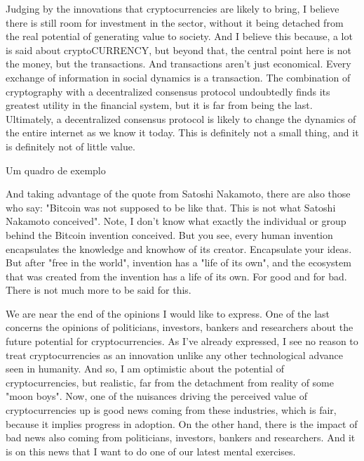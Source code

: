 Judging by the innovations that cryptocurrencies are likely to bring, I believe there is still room for investment in the sector, without it being detached from the real potential of generating value to society. And I believe this because, a lot is said about cryptoCURRENCY, but beyond that, the central point here is not the money, but the transactions. And transactions aren't just economical. Every exchange of information in social dynamics is a transaction. The combination of cryptography with a decentralized consensus protocol undoubtedly finds its greatest utility in the financial system, but it is far from being the last. Ultimately, a decentralized consensus protocol is likely to change the dynamics of the entire internet as we know it today. This is definitely not a small thing, and it is definitely not of little value.

\begin{quadro}[!hbt]
  \centering
  \caption{Um quadro de exemplo}
  \label{quadro-exemplo}
\end{quadro}

And taking advantage of the quote from Satoshi Nakamoto, there are also those who say: "Bitcoin was not supposed to be like that. This is not what Satoshi Nakamoto conceived". Note, I don't know what exactly the individual or group behind the Bitcoin invention conceived. But you see, every human invention encapsulates the knowledge and knowhow of its creator. Encapsulate your ideas. But after "free in the world", invention has a "life of its own", and the ecosystem that was created from the invention has a life of its own. For good and for bad. There is not much more to be said for this.

We are near the end of the opinions I would like to express. One of the last concerns the opinions of politicians, investors, bankers and researchers about the future potential for cryptocurrencies. As I've already expressed, I see no reason to treat cryptocurrencies as an innovation unlike any other technological advance seen in humanity. And so, I am optimistic about the potential of cryptocurrencies, but realistic, far from the detachment from reality of some "moon boys". Now, one of the nuisances driving the perceived value of cryptocurrencies up is good news coming from these industries, which is fair, because it implies progress in adoption. On the other hand, there is the impact of bad news also coming from politicians, investors, bankers and researchers. And it is on this news that I want to do one of our latest mental exercises.

